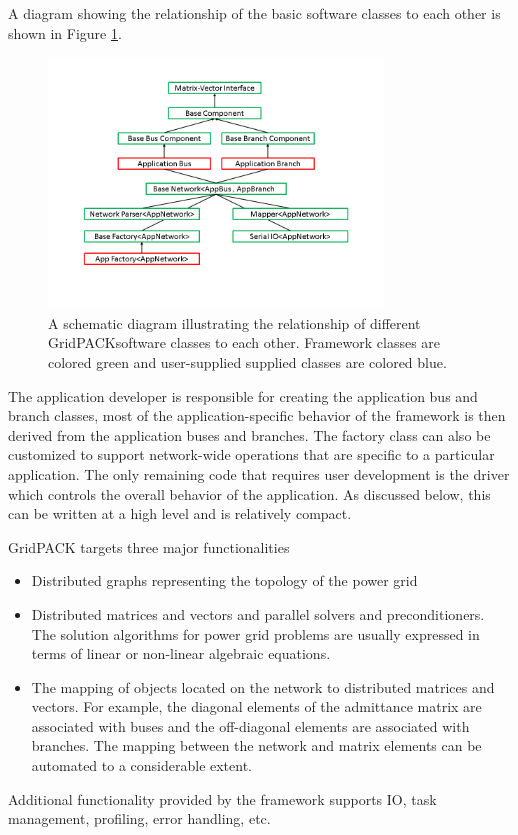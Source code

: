 \documentclass[preprint]{acm_proc_article-sp}
\begin{document}
A diagram showing the relationship of the basic software classes to each other
is shown in Figure \ref{templates}.
\begin{figure}
\centering
\includegraphics[width=3.5in,keepaspectratio=true]{./Fig2}
\caption{\label{templates} A schematic diagram illustrating the relationship of
different GridPACK\texttrademark software classes to each other.
Framework classes are colored green and user-supplied supplied classes are
colored blue. }
\end{figure}
The application developer is responsible for creating the application bus
and branch classes, most of the application-specific behavior of the framework
is then derived from the application buses and branches. The factory
class can also be customized to support network-wide operations that are
specific to a particular application. The only remaining code that requires
user development is the driver which controls the overall behavior
of the application. As discussed below, this can be written at a high
level and is relatively compact.

GridPACK targets three major functionalities
\begin{itemize}
\item Distributed graphs representing the topology of the power grid
\item Distributed matrices and vectors and parallel solvers and
preconditioners. The solution algorithms for power grid problems are usually
expressed in terms of linear or non-linear algebraic equations. 
\item The mapping of objects located on the network to distributed matrices and vectors.
For example, the diagonal elements of the admittance matrix are associated with
buses and the off-diagonal elements are associated with branches. The mapping
between the network and matrix elements can be automated to a considerable
extent.
\end{itemize}
Additional functionality provided by the framework supports IO, task management,
profiling, error handling, etc. 
\end{document}
